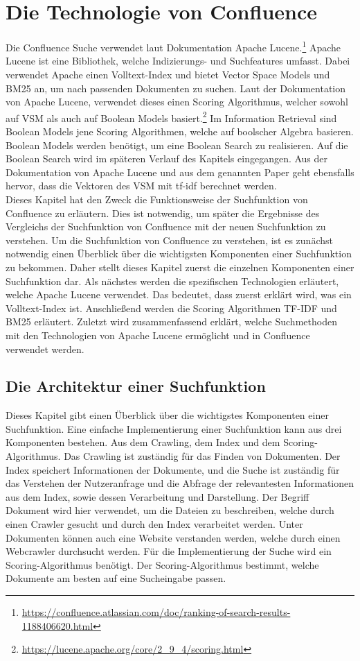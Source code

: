 \chapter{Die Technologie von Confluence}
Die Confluence Suche verwendet laut Dokumentation Apache Lucene.\footnote{\url{https://confluence.atlassian.com/doc/ranking-of-search-results-1188406620.html}}
Apache Lucene ist eine Bibliothek, welche Indizierungs- und Suchfeatures umfasst.
Dabei verwendet Apache einen Volltext-Index und bietet Vector Space Models und BM25 an, um nach passenden Dokumenten zu suchen.
Laut der Dokumentation von Apache Lucene, verwendet dieses einen Scoring Algorithmus, welcher sowohl auf VSM als auch auf Boolean Models basiert.\footnote{\url{https://lucene.apache.org/core/2_9_4/scoring.html}}
Im Information Retrieval sind Boolean Models jene Scoring Algorithmen, welche auf boolscher Algebra basieren.
Boolean Models werden benötigt, um eine Boolean Search zu realisieren.
Auf die Boolean Search wird im späteren Verlauf des Kapitels eingegangen.
Aus der Dokumentation von Apache Lucene und aus dem genannten Paper geht ebensfalls hervor, dass die Vektoren des VSM mit tf-idf berechnet werden.\\

Dieses Kapitel hat den Zweck die Funktionsweise der Suchfunktion von Confluence zu erläutern.
Dies ist notwendig, um später die Ergebnisse des Vergleichs der Suchfunktion von Confluence mit der neuen Suchfunktion zu verstehen.
Um die Suchfunktion von Confluence zu verstehen, ist es zunächst notwendig einen Überblick über die wichtigsten Komponenten einer Suchfunktion zu bekommen.
Daher stellt dieses Kapitel zuerst die einzelnen Komponenten einer Suchfunktion dar.
Als nächstes werden die spezifischen Technologien erläutert, welche Apache Lucene verwendet.
Das bedeutet, dass zuerst erklärt wird, was ein Volltext-Index ist.
Anschließend werden die Scoring Algorithmen TF-IDF und BM25 erläutert.
Zuletzt wird zusammenfassend erklärt, welche Suchmethoden mit den Technologien von Apache Lucene ermöglicht und in Confluence verwendet werden.

\section{Die Architektur einer Suchfunktion}
Dieses Kapitel gibt einen Überblick über die wichtigstes Komponenten einer Suchfunktion.
Eine einfache Implementierung einer Suchfunktion kann aus drei Komponenten bestehen.
Aus dem Crawling, dem Index und dem Scoring-Algorithmus.
Das Crawling ist zuständig für das Finden von Dokumenten\cite{Castillo_2005}.
Der Index speichert Informationen der Dokumente, und die Suche ist zuständig für das Verstehen der Nutzeranfrage und die Abfrage der relevantesten Informationen aus dem Index, sowie dessen Verarbeitung und Darstellung.
Der Begriff Dokument wird hier verwendet, um die Dateien zu beschreiben, welche durch einen Crawler gesucht und durch den Index verarbeitet werden.
Unter Dokumenten können auch eine Website verstanden werden, welche durch einen Webcrawler durchsucht werden.
Für die Implementierung der Suche wird ein Scoring-Algorithmus benötigt.
Der Scoring-Algorithmus bestimmt, welche Dokumente am besten auf eine Sucheingabe passen.\\

